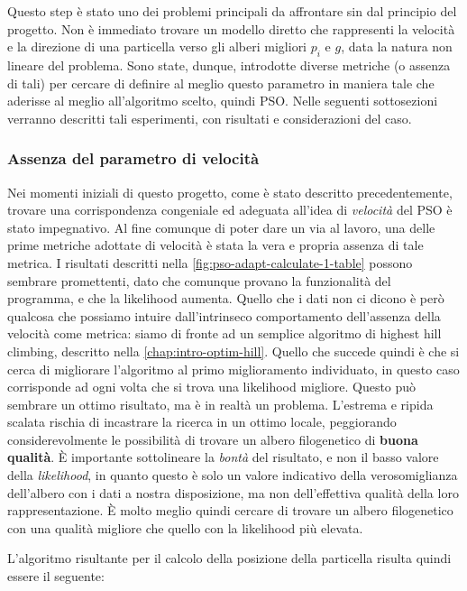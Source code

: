 Questo step è stato uno dei problemi principali da affrontare sin dal principio del progetto. Non è immediato trovare un modello diretto che rappresenti la velocità e la direzione di una particella verso gli alberi migliori $p_i$ e $g$, data la natura non lineare del problema. Sono state, dunque, introdotte diverse metriche (o assenza di tali) per cercare di definire al meglio questo parametro in maniera tale che aderisse al meglio all'algoritmo scelto, quindi PSO. Nelle seguenti sottosezioni verranno descritti tali esperimenti, con risultati e considerazioni del caso.

\subsubsection{Assenza del parametro di velocità}
\label{chap:pso-adapt-calculate-1}
Nei momenti iniziali di questo progetto, come è stato descritto precedentemente, trovare una corrispondenza congeniale ed adeguata all'idea di \textit{velocità} del PSO è stato impegnativo. Al fine comunque di poter dare un via al lavoro, una delle prime metriche adottate di velocità è stata la vera e propria assenza di tale metrica. I risultati descritti nella \autoref{fig:pso-adapt-calculate-1-table} possono sembrare promettenti, dato che comunque provano la funzionalità del programma, e che la likelihood aumenta. Quello che i dati non ci dicono è però qualcosa che possiamo intuire dall'intrinseco comportamento dell'assenza della velocità come metrica: siamo di fronte ad un semplice algoritmo di highest hill climbing, descritto nella \autoref{chap:intro-optim-hill}. Quello che succede quindi è che si cerca di migliorare l'algoritmo al primo miglioramento individuato, in questo caso corrisponde ad ogni volta che si trova una likelihood migliore. Questo può sembrare un ottimo risultato, ma è in realtà un problema. L'estrema e ripida scalata rischia di incastrare la ricerca in un ottimo locale, peggiorando considerevolmente le possibilità di trovare un albero filogenetico di \textbf{buona qualità}. È importante sottolineare la \textit{bontà} del risultato, e non il basso valore della \textit{likelihood}, in quanto questo è solo un valore indicativo della verosomiglianza dell'albero con i dati a nostra disposizione, ma non dell'effettiva qualità della loro rappresentazione. È molto meglio quindi cercare di trovare un albero filogenetico con una qualità migliore che quello con la likelihood più elevata.

L'algoritmo risultante per il calcolo della posizione della particella risulta quindi essere il seguente:

